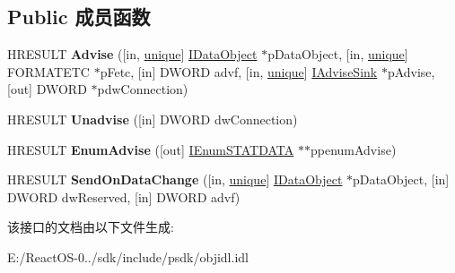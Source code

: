 \subsection*{Public 成员函数}
\begin{DoxyCompactItemize}
\item 
\mbox{\label{interface_i_data_advise_holder_a8e10eebdc0d8c7dab7082f768c5d4e06}} 
H\+R\+E\+S\+U\+LT {\bfseries Advise} (\mbox{[}in, \hyperlink{interfaceunique}{unique}\mbox{]} \hyperlink{interface_i_data_object}{I\+Data\+Object} $\ast$p\+Data\+Object, \mbox{[}in, \hyperlink{interfaceunique}{unique}\mbox{]} F\+O\+R\+M\+A\+T\+E\+TC $\ast$p\+Fetc, \mbox{[}in\mbox{]} D\+W\+O\+RD advf, \mbox{[}in, \hyperlink{interfaceunique}{unique}\mbox{]} \hyperlink{interface_i_advise_sink}{I\+Advise\+Sink} $\ast$p\+Advise, \mbox{[}out\mbox{]} D\+W\+O\+RD $\ast$pdw\+Connection)
\item 
\mbox{\label{interface_i_data_advise_holder_af1fd134b5785aa3453f79fa634fb3b42}} 
H\+R\+E\+S\+U\+LT {\bfseries Unadvise} (\mbox{[}in\mbox{]} D\+W\+O\+RD dw\+Connection)
\item 
\mbox{\label{interface_i_data_advise_holder_a08ae9afa6d0a96776306cd927bbf4038}} 
H\+R\+E\+S\+U\+LT {\bfseries Enum\+Advise} (\mbox{[}out\mbox{]} \hyperlink{interface_i_enum_s_t_a_t_d_a_t_a}{I\+Enum\+S\+T\+A\+T\+D\+A\+TA} $\ast$$\ast$ppenum\+Advise)
\item 
\mbox{\label{interface_i_data_advise_holder_a87d996dc1fd3264f3d9dc6065ade5f68}} 
H\+R\+E\+S\+U\+LT {\bfseries Send\+On\+Data\+Change} (\mbox{[}in, \hyperlink{interfaceunique}{unique}\mbox{]} \hyperlink{interface_i_data_object}{I\+Data\+Object} $\ast$p\+Data\+Object, \mbox{[}in\mbox{]} D\+W\+O\+RD dw\+Reserved, \mbox{[}in\mbox{]} D\+W\+O\+RD advf)
\end{DoxyCompactItemize}


该接口的文档由以下文件生成\+:\begin{DoxyCompactItemize}
\item 
E\+:/\+React\+O\+S-\/0../sdk/include/psdk/objidl.\+idl\end{DoxyCompactItemize}
